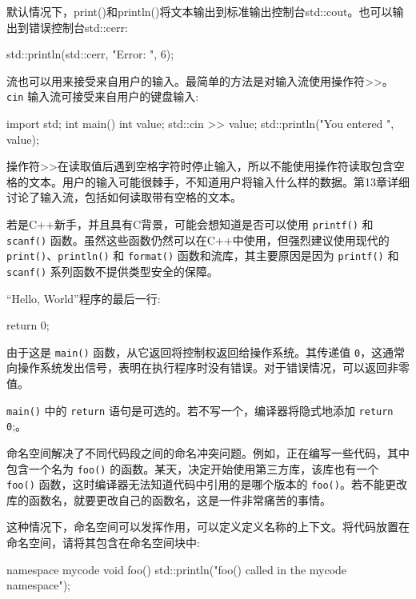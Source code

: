 默认情况下，print()和println()将文本输出到标准输出控制台std::cout。也可以输出到错误控制台std::cerr:

\begin{cpp}
std::println(std::cerr, "Error: {}", 6);
\end{cpp}

流也可以用来接受来自用户的输入。最简单的方法是对输入流使用操作符>{}>。\verb|cin| 输入流可接受来自用户的键盘输入:

\begin{cpp}
import std;
int main()
{
    int value;
    std::cin >> value;
    std::println("You entered {}", value);
}
\end{cpp}

操作符>{}>在读取值后遇到空格字符时停止输入，所以不能使用操作符读取包含空格的文本。用户的输入可能很棘手，不知道用户将输入什么样的数据。第13章详细讨论了输入流，包括如何读取带有空格的文本。

若是C++新手，并且具有C背景，可能会想知道是否可以使用 \verb|printf()| 和 \verb|scanf()| 函数。虽然这些函数仍然可以在C++中使用，但强烈建议使用现代的 \verb|print()|、\verb|println()| 和 \verb|format()| 函数和流库，其主要原因是因为 \verb|printf()| 和 \verb|scanf()| 系列函数不提供类型安全的保障。


“Hello, World”程序的最后一行:

\begin{cpp}
return 0;
\end{cpp}

由于这是 \verb|main()| 函数，从它返回将控制权返回给操作系统。其传递值 \verb|0|，这通常向操作系统发出信号，表明在执行程序时没有错误。对于错误情况，可以返回非零值。

\verb|main()| 中的 \verb|return| 语句是可选的。若不写一个，编译器将隐式地添加 \verb|return 0|;。


命名空间解决了不同代码段之间的命名冲突问题。例如，正在编写一些代码，其中包含一个名为 \verb|foo()| 的函数。某天，决定开始使用第三方库，该库也有一个 \verb|foo()| 函数，这时编译器无法知道代码中引用的是哪个版本的 \verb|foo()|。若不能更改库的函数名，就要更改自己的函数名，这是一件非常痛苦的事情。

这种情况下，命名空间可以发挥作用，可以定义定义名称的上下文。将代码放置在命名空间，请将其包含在命名空间块中:

\begin{cpp}
namespace mycode {
    void foo()
    {
        std::println("foo() called in the mycode namespace");
    }
}
\end{cpp}

